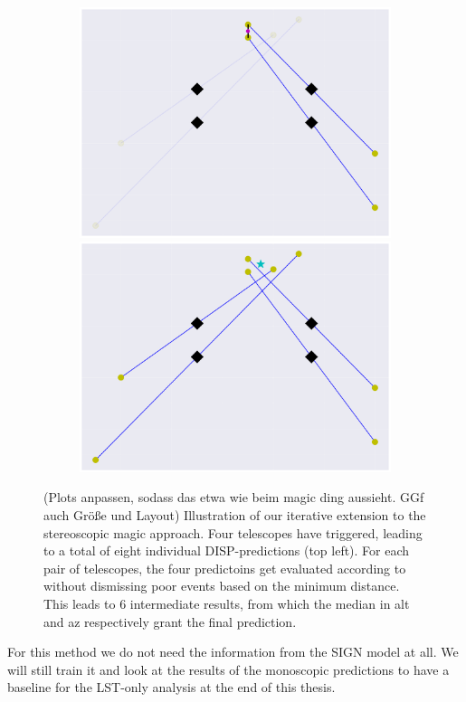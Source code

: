 \begin{figure}
\begin{subfigure}{0.45\textwidth}
    \end{subfigure}
    \begin{subfigure}{0.45\textwidth}
        \includegraphics[width=0.8\linewidth]{Plots/stereo_magic_5.pdf}
        \includegraphics[width=0.8\linewidth]{Plots/stereo_magic_result.pdf}
    \end{subfigure}
    \caption{(Plots anpassen, sodass das etwa wie beim magic ding aussieht. GGf auch Größe und Layout)
    Illustration of our iterative extension to the stereoscopic magic approach.
    Four telescopes have triggered, leading to a total of eight individual DISP-predictions (top left).
    For each pair of telescopes, the four predictoins get evaluated according to \cite{ALEKSIC201676}
    without dismissing poor events based on the minimum distance.
    This leads to 6 intermediate results, from which the median in
    alt and az respectively grant the final prediction.}
    \label{fig:stereo_disp}
\end{figure}

For this method we do not need the information from the SIGN model at all.
We will still train it and look at the results of the monoscopic
predictions to have a baseline for the LST-only analysis at the end of this thesis.


